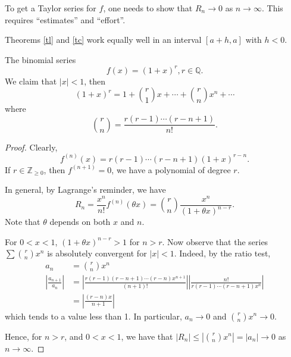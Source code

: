To get a Taylor series for \(f\), one needs to show that \(R_n \to 0\) as \(n \to \infty\). This requires ``estimates'' and ``effort''.
\begin{remark}
    Theorems \eqref{tl} and \eqref{tc} work equally well in an interval \([a + h, a]\) with \(h < 0\).
\end{remark}
\begin{example}
    The binomial series
    \[
        f(x) = (1 + x)^r, r\in \mathbb{Q}.
    \]
    We claim that \(\left\vert x \right\vert< 1\), then
    \[
        (1 + x)^r = 1 + \binom{r}{1}x + \cdots + \binom{r}{n}x^n + \cdots
    \]
    where
    \[
        \binom{r}{n} = \frac{r(r-1)\cdots (r - n + 1)}{n!}.
    \]
    \begin{proof}
        Clearly,
        \[
            f^{(n)}(x) = r(r - 1) \cdots (r - n + 1)(1 + x)^{r-n}.
        \]
        If \(r\in \mathbb{Z}_{\geq 0}\), then \(f^{(n+1)}=0\), we have a polynomial of degree \(r\).

        In general, by Lagrange's reminder, we have
        \[
            R_n = \frac{x^n}{n!}f^{(n)}(\theta x) = \binom{r}{n}\frac{x^n}{(1+\theta x)^{n - r}}.
        \]
        Note that \(\theta\) depends on both \(x\) and \(n\).

        For \(0 < x < 1\), \((1 + \theta x)^{n - r} > 1\) for \(n > r\). Now observe that the series \(\sum \binom{r}{n}x^n\) is absolutely convergent for \(\left\vert x \right\vert < 1\). Indeed, by the ratio test,
        \begin{align*}
            a_n &= \binom{r}{n}x^n\\
            \left\vert \frac{a_{n+1}}{a_n} \right\vert &= \left\vert \frac{r(r-1)(r-n+1)\cdots(r-n)x^{n+1}}{(n+1)!} \right\vert \left\vert \frac{n!}{r(r-1)\cdots (r-n+1)x^n} \right\vert\\
            &=\left\vert \frac{(r-n)x}{n+1} \right\vert
        \end{align*}
        which tends to a value less than 1. In particular, \(a_n \to 0\) and \(\binom{r}{n}x^n \to 0\).

        Hence, for \(n > r\), and \( 0 < x < 1\), we have that \(\left\vert R_n \right\vert \leq \left\vert \binom{r}{n}x^n \right\vert  = \left\vert a_n \right\vert \to 0\) as \(n \to \infty\).


\end{proof}
\end{example}
